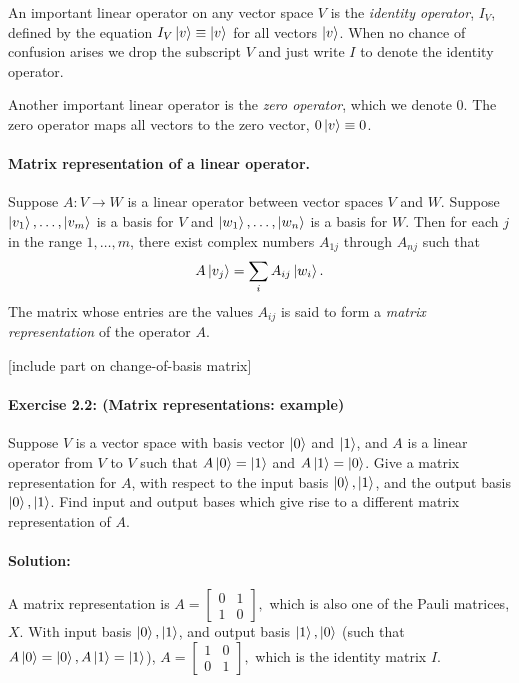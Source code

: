 An important linear operator on any vector space $V$ is the \emph{identity
operator}, $I_V$, defined by the equation $I_V\ket{v} \equiv \ket{v}$ for all
vectors $\ket{v}$. When no chance of confusion arises we drop the subscript $V$
and just write $I$ to denote the identity operator.

Another important linear operator is the \emph{zero operator}, which we denote
0. The zero operator maps all vectors to the zero vector, $0\ket{v} \equiv 0$.

\paragraph{Matrix representation of a linear operator.} Suppose $A : V
\rightarrow W$ is a linear operator between vector spaces $V$ and $W$. Suppose
$\ket{v_1}, \ldots, \ket{v_m}$ is a basis for $V$ and $\ket{w_1}, \ldots,
\ket{w_n}$ is a basis for $W$. Then for each $j$ in the range $1, \ldots, m$,
there exist complex numbers $A_{1j}$ through $A_{nj}$ such that
\begin{equation}
  A\ket{v_j} = \sum_i A_{ij}\ket{w_i}.
\end{equation} The matrix whose entries are the values $A_{ij}$ is said to form
a \emph{matrix representation} of the operator $A$.

[include part on change-of-basis matrix]

\paragraph{\cite{mikeandike} Exercise 2.2: (Matrix representations: example)}
Suppose $V$ is a vector space with basis vector $\ket{0}$ and $\ket{1}$, and
$A$ is a linear operator from $V$ to $V$ such that $A\ket{0} = \ket{1}$ and
$A\ket{1} = \ket{0}$. Give a matrix representation for $A$, with respect to the
input basis $\ket{0}, \ket{1}$, and the output basis $\ket{0}, \ket{1}$. Find
input and output bases which give rise to a different matrix representation of
$A$.

\paragraph{Solution:} A matrix representation is $A = \begin{bmatrix}
  0 & 1 \\
  1 & 0
\end{bmatrix},$ which is also one of the Pauli matrices, $X$. With input basis
$\ket{0}, \ket{1}$, and output basis $\ket{1}, \ket{0}$ (such that $A\ket{0} =
\ket{0}, A\ket{1} = \ket{1}$), $A = \begin{bmatrix}
  1 & 0 \\
  0 & 1
\end{bmatrix},$ which is the identity matrix $I$.


